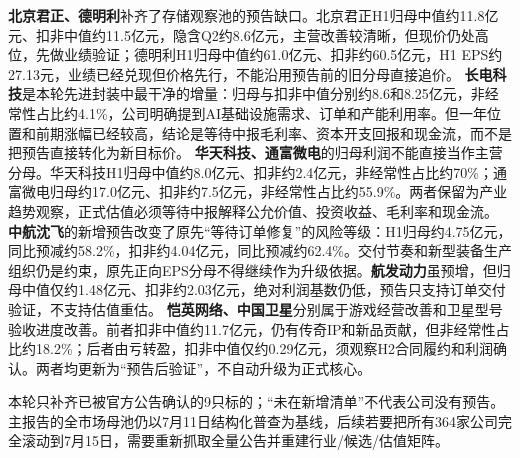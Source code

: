 \textbf{北京君正、德明利}补齐了存储观察池的预告缺口。北京君正H1归母中值约11.8亿元、扣非中值约11.5亿元，隐含Q2约8.6亿元，主营改善较清晰，但现价仍处高位，先做业绩验证；德明利H1归母中值约61.0亿元、扣非约60.5亿元，H1 EPS约27.13元，业绩已经兑现但价格先行，不能沿用预告前的旧分母直接追价。
\textbf{长电科技}是本轮先进封装中最干净的增量：归母与扣非中值分别约8.6和8.25亿元，非经常性占比约4.1\%，公司明确提到AI基础设施需求、订单和产能利用率。但一年位置和前期涨幅已经较高，结论是等待中报毛利率、资本开支回报和现金流，而不是把预告直接转化为新目标价。
\textbf{华天科技、通富微电}的归母利润不能直接当作主营分母。华天科技H1归母中值约8.0亿元、扣非约2.4亿元，非经常性占比约70\%；通富微电归母约17.0亿元、扣非约7.5亿元，非经常性占比约55.9\%。两者保留为产业趋势观察，正式估值必须等待中报解释公允价值、投资收益、毛利率和现金流。
\textbf{中航沈飞}的新增预告改变了原先“等待订单修复”的风险等级：H1归母约4.75亿元，同比预减约58.2\%，扣非约4.04亿元，同比预减约62.4\%。交付节奏和新型装备生产组织仍是约束，原先正向EPS分母不得继续作为升级依据。\textbf{航发动力}虽预增，但归母中值仅约1.48亿元、扣非约2.03亿元，绝对利润基数仍低，预告只支持订单交付验证，不支持估值重估。
\textbf{恺英网络、中国卫星}分别属于游戏经营改善和卫星型号验收进度改善。前者扣非中值约11.7亿元，仍有传奇IP和新品贡献，但非经常性占比约18.2\%；后者由亏转盈，扣非中值仅约0.29亿元，须观察H2合同履约和利润确认。两者均更新为“预告后验证”，不自动升级为正式核心。

\begin{riskbox}[增量数据边界]
本轮只补齐已被官方公告确认的9只标的；“未在新增清单”不代表公司没有预告。主报告的全市场母池仍以7月11日结构化普查为基线，后续若要把所有364家公司完全滚动到7月15日，需要重新抓取全量公告并重建行业/候选/估值矩阵。
\end{riskbox}
